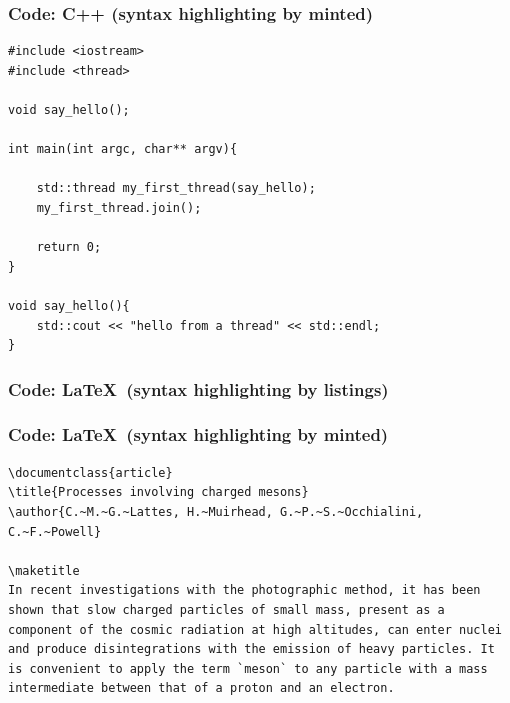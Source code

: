 \begin{frame}[fragile]
\frametitle{Code: C++ (syntax highlighting by minted)}
\color{white255255255}
\begin{verbatim}
#include <iostream>
#include <thread>

void say_hello();

int main(int argc, char** argv){

    std::thread my_first_thread(say_hello);
    my_first_thread.join();

    return 0;
}

void say_hello(){
    std::cout << "hello from a thread" << std::endl;
}
\end{verbatim}
\end{frame}

\begin{frame}[fragile]
\frametitle{Code: \LaTeX~(syntax highlighting by listings)}
\end{frame}

\begin{frame}[fragile]
\frametitle{Code: \LaTeX~(syntax highlighting by minted)}
\begin{verbatim}
\documentclass{article}
\title{Processes involving charged mesons}
\author{C.~M.~G.~Lattes, H.~Muirhead, G.~P.~S.~Occhialini, C.~F.~Powell}

\maketitle
In recent investigations with the photographic method, it has been shown that slow charged particles of small mass, present as a component of the cosmic radiation at high altitudes, can enter nuclei and produce disintegrations with the emission of heavy particles. It is convenient to apply the term `meson` to any particle with a mass intermediate between that of a proton and an electron.

\end{verbatim}
\end{frame}

